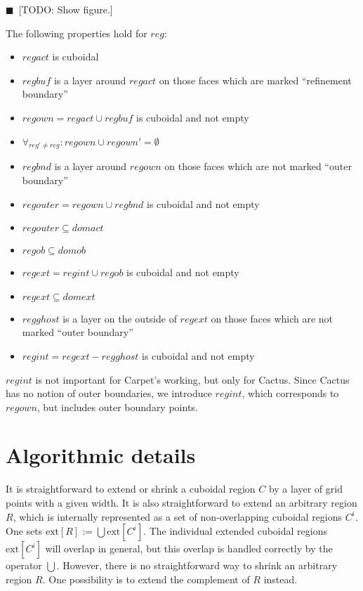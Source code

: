 \documentclass[nofootinbib, twocolumn]{revtex4}
\newcommand{\todo}[1]{{\color{blue}$\blacksquare$~\textsf{[TODO: #1]}}}
\begin{document}
\todo{Show figure.}

The following properties hold for $reg$:
\begin{itemize}
\item $regact$ is cuboidal
\item $regbuf$ is a layer around $regact$ on those faces which are
  marked ``refinement boundary''
\item $regown = regact \cup regbuf$ is cuboidal and not empty
\item $\forall_{reg' \ne reg}: regown \cup regown' = \emptyset$
\item $regbnd$ is a layer around $regown$ on those faces which are not
  marked ``outer boundary''
\item $regouter = regown \cup regbnd$ is cuboidal and not empty
\item $regouter \subseteq domact$
\item $regob \subseteq domob$
\item $regext = regint \cup regob$ is cuboidal and not empty
\item $regext \subseteq domext$

\item $regghost$ is a layer on the outside of $regext$ on those faces
  which are not marked ``outer boundary''
\item $regint = regext - regghost$ is cuboidal and not empty
\end{itemize}
$regint$ is not important for Carpet's working, but only for Cactus.
Since Cactus has no notion of outer boundaries, we introduce $regint$,
which corresponds to $regown$, but includes outer boundary points.



\section{Algorithmic details}

It is straightforward to extend or shrink a cuboidal region $C$ by a
layer of grid points with a given width.  It is also straightforward
to extend an arbitrary region $R$, which is internally represented as
a set of non-overlapping cuboidal regions ${C^i}$.  One sets
$\mathrm{ext}[R] := \bigcup \mathrm{ext}[C^i]$.  The individual
extended cuboidal regions $\mathrm{ext}[C^i]$ will overlap in general,
but this overlap is handled correctly by the operator $\bigcup$.
However, there is no straightforward way to shrink an arbitrary region
$R$.  One possibility is to extend the complement of $R$ instead.
\end{document}
